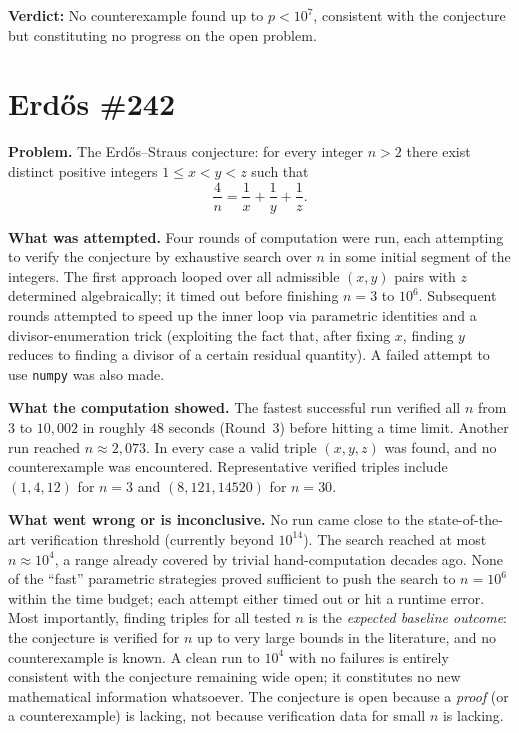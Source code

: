 \documentclass[11pt]{article}
\begin{document}
\textbf{Verdict:} No counterexample found up to $p < 10^7$, consistent with the conjecture but constituting no progress on the open problem.

\clearpage

\section{Erd\H{o}s \#242}

\textbf{Problem.} The Erd\H{o}s--Straus conjecture: for every integer $n > 2$ there exist
distinct positive integers $1 \le x < y < z$ such that
\[
  \frac{4}{n} = \frac{1}{x} + \frac{1}{y} + \frac{1}{z}.
\]

\textbf{What was attempted.} Four rounds of computation were run, each attempting to
verify the conjecture by exhaustive search over $n$ in some initial segment of the
integers.  The first approach looped over all admissible $(x,y)$ pairs with $z$ determined
algebraically; it timed out before finishing $n = 3$ to $10^{6}$.  Subsequent rounds
attempted to speed up the inner loop via parametric identities and a divisor-enumeration
trick (exploiting the fact that, after fixing $x$, finding $y$ reduces to finding a
divisor of a certain residual quantity).  A failed attempt to use \texttt{numpy} was
also made.

\textbf{What the computation showed.} The fastest successful run verified all $n$ from
$3$ to $10{,}002$ in roughly $48$ seconds (Round~3) before hitting a time limit.
Another run reached $n \approx 2{,}073$.  In every case a valid triple $(x,y,z)$ was
found, and no counterexample was encountered.  Representative verified triples include
$(1,4,12)$ for $n=3$ and $(8,121,14520)$ for $n=30$.

\textbf{What went wrong or is inconclusive.} No run came close to the
state-of-the-art verification threshold (currently beyond $10^{14}$).  The search
reached at most $n \approx 10^{4}$, a range already covered by
trivial hand-computation decades ago.  None of the ``fast'' parametric strategies
proved sufficient to push the search to $n = 10^{6}$ within the time budget; each
attempt either timed out or hit a runtime error.  Most importantly, finding triples
for all tested $n$ is the \emph{expected baseline outcome}: the conjecture is verified
for $n$ up to very large bounds in the literature, and no counterexample is known.
A clean run to $10^{4}$ with no failures is entirely consistent with the conjecture
remaining wide open; it constitutes no new mathematical information whatsoever.
The conjecture is open because a \emph{proof} (or a counterexample) is lacking, not
because verification data for small $n$ is lacking.
\end{document}
